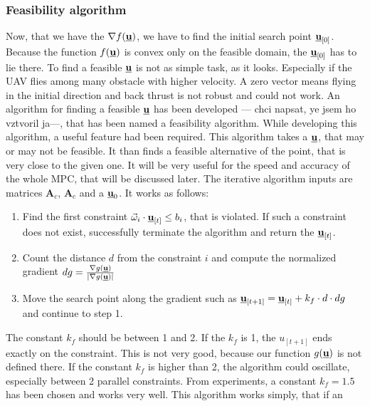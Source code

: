 \documentclass{article}
\newcommand{\uvec}{\textbf{\underline{u}}}
\newcommand{\macf}{f(\uvec)}
\newcommand{\macg}{g(\uvec)}
\newcommand{\macoi}{\vec{\omega}_i}
\begin{document}
\subsubsection{Feasibility algorithm}
Now, that we have the $\nabla \macf$, we have to find the initial search point $\uvec_{[0]}$. Because the function $\macf$ is convex only on the feasible domain, the $\uvec_{[0]}$ has to lie there. To find a feasible $\uvec$ is not as simple task, as it looks. Especially if the UAV flies among many obstacle with higher velocity. A zero vector means flying in the initial direction and back thrust is not robust and could not work. An algorithm for finding a feasible $\uvec$ has been developed --- chci napsat, ye jsem ho vztvoril ja---, that has been named a feasibility algorithm. While developing this algorithm, a useful feature had been required. This algorithm takes a $\uvec$, that may or may not be feasible. It than finds a feasible alternative of the point, that is very close to the given one. It will be very useful for the speed and accuracy of the whole MPC, that will be discussed later. The iterative algorithm inputs are matrices $\textbf{A}_c$, $\textbf{A}_c$ and a $\uvec_0$. It works as follows:

\begin{enumerate}
\item Find the first constraint $\macoi \cdot \uvec_{[t]} \leq b_i$, that is violated. If such a constraint does not exist, successfully terminate the algorithm and return the $\uvec_{[t]}$.

\item Count the distance $d$ from the constraint $i$ and compute the normalized gradient $dg = \frac{\nabla \macg}{|\nabla \macg|}$

\item Move the search point along the gradient such as $\uvec_{[t+1]} = \uvec_{[t]} + k_f \cdot d \cdot dg$ and continue to step 1.
\end{enumerate}

The constant $k_f$ should be between 1 and 2. If the $k_f$ is 1, the $u_{[t+1]}$ ends exactly on the constraint. This is not very good, because our function $\macg$ is not defined there. If the constant $k_f$ is higher than 2, the algorithm could oscillate, especially between 2 parallel constraints. From experiments, a constant $k_f = 1.5$ has been chosen and works very well. This algorithm works simply, that if an 
\end{document}
